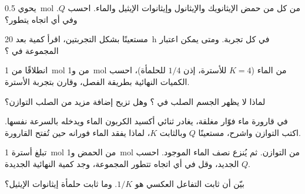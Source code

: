 \begin{exercise}[$\star\star$]\label{exo:g12:equilibrium:7}
يحوي  \qty{0.5}{mol} من كل من حمض الإيثانويك والإيثانول وإيثانوات
الإيثيل والماء. احسب $Q$. وفي أي اتجاه يتطور؟
\end{exercise}

\begin{exercise}[$\star\star$]\label{exo:g12:equilibrium:8}
مستعينًا بشكل التجربتين، اقرأ كمية  بعد
\qty{20}{h} في كل تجربة. ومتى يمكن اعتبار المجموعة في
؟
\end{exercise}

\begin{exercise}[$\star\star$]\label{exo:g12:equilibrium:9}
انطلاقًا من \qty{1}{mol} من  و\qty{1}{mol} من الماء ($K = 4$
للأسترة، إذن $1/4$ للحلمأة)، احسب الكميات النهائية
بطريقة الفصل، وقارن بتجربة
الأسترة.
\end{exercise}

\begin{exercise}[$\star\star$]\label{exo:g12:equilibrium:10}
لماذا لا يظهر الجسم الصلب في 
؟ وهل تزيح إضافة مزيد من الصلب
التوازن؟
\end{exercise}

\begin{exercise}[$\star\star$]\label{exo:g12:equilibrium:11}
في قارورة ماء فوّار مغلقة، يغادر ثنائي أكسيد الكربون الماء ويدخله
بالسرعة نفسها. اكتب التوازن
 واشرح، مستعينًا  $Q$ وبالثابت $K$، لماذا يفقد الماء فورانه
حين تُفتح القارورة.
\end{exercise}

\begin{exercise}[$\star\star\star$]\label{exo:g12:equilibrium:12}
تبلغ أسترة \qty{1}{mol} من الحمض و\qty{1}{mol} من 
التوازن. ثم يُنزع نصف الماء الموجود. احسب
 $Q$ الجديد، وقل في أي اتجاه تتطور المجموعة، وجد كمية 
النهائية الجديدة.
\end{exercise}

\begin{exercise}[$\star\star\star$]\label{exo:g12:equilibrium:13}
بيّن أن ثابت التفاعل العكسي هو $1/K$. وما
ثابت حلمأة إيثانوات الإيثيل؟
\end{exercise}

